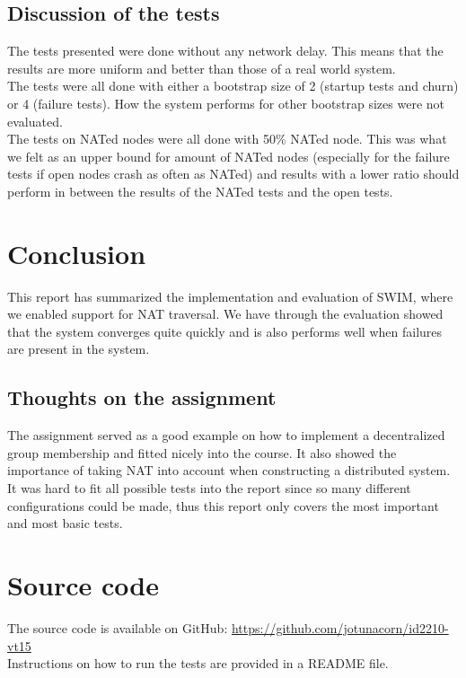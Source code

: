 \documentclass[10pt]{proc}
\begin{document}
\subsection{Discussion of the tests}
The tests presented were done without any network delay. This means that the results are more uniform and better than those of a real world system. 
\\[10pt]
The tests were all done with either a bootstrap size of 2 (startup tests and churn) or 4 (failure tests). How the system performs for other bootstrap sizes were not evaluated.
\\[10pt]
The tests on NATed nodes were all done with 50\% NATed node. This was what we felt as an upper bound for amount of NATed nodes (especially for the failure tests if open nodes crash as often as NATed) and results with a lower ratio should perform in between the results of the NATed tests and the open tests.
\section{Conclusion}
This report has summarized the implementation and evaluation of SWIM, where we enabled support for NAT traversal. We have through the evaluation showed that the system converges quite quickly and is also performs well when failures are present in the system.
\subsection{Thoughts on the assignment}
The assignment served as a good example on how to implement a decentralized group membership and fitted nicely into the course. It also showed the importance of taking NAT into account when constructing a distributed system. It was hard to fit all possible tests into the report since so many different configurations could be made, thus this report only covers the most important and most basic tests.
\clearpage
\appendix
\section{Source code}
The source code is available on GitHub: \url{https://github.com/jotunacorn/id2210-vt15}
\\[10pt]
Instructions on how to run the tests are provided in a README file.
\end{document}
